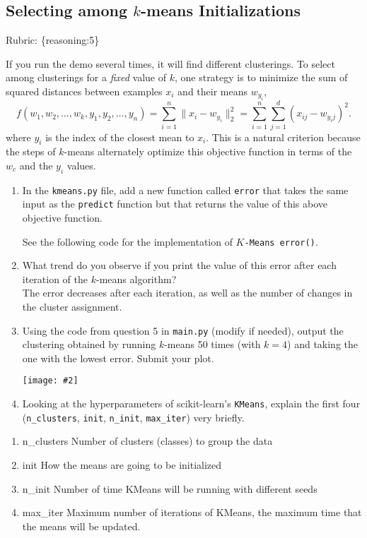 \documentclass{article}
\def\rubric#1{\gre{Rubric: \{#1\}}}{}
\def\blu#1{{\color{blu}#1}}
\def\gre#1{{\color{gre}#1}}
\def\ans#1{{\color{ans}#1}}
\def\norm#1{\|#1\|}
\newcommand{\centerfig}[2]{\begin{center}\texttt{[image: \#2]}\end{center}}
\def\enum#1{\begin{enumerate}#1\end{enumerate}}
\begin{document}
\subsection{Selecting among $k$-means Initializations}
\rubric{reasoning:5}

If you run the demo several times, it will find different clusterings. To select among clusterings for a \emph{fixed} value of $k$, one strategy is to minimize the sum of squared distances between examples $x_i$ and their means $w_{y_i}$,
\[
f(w_1,w_2,\dots,w_k,y_1,y_2,\dots,y_n) = \sum_{i=1}^n \norm{x_i - w_{y_i}}_2^2 = \sum_{i=1}^n \sum_{j=1}^d (x_{ij} - w_{y_ij})^2.
\]
 where $y_i$ is the index of the closest mean to $x_i$. This is a natural criterion because the steps of $k$-means alternately optimize this objective function in terms of the $w_c$ and the $y_i$ values.

 \blu{\enum{
 \item In the \texttt{kmeans.py} file, add a new function called \texttt{error} that takes the same input as the \texttt{predict} function but that returns the value of this above objective function. \\
   \ans{
      See the following code for the implementation of \texttt{$K$-Means error()}.\\
      \begin{center}
         
     \end{center}
   }
 \item What trend do you observe if you print the value of this error after each iteration of the $k$-means algorithm? \\ 
   \ans{
      The error decreases after each iteration, as well as the number of changes in the cluster assignment.
   }
 \item Using the code from question 5 in \texttt{main.py} (modify if needed), output the clustering obtained by running $k$-means 50 times (with $k=4$) and taking the one with the lowest error. Submit your plot. \\
   \ans{
      \centerfig{1}{../figs/q_5_1_kmeans.pdf}
   }
 \item Looking at the hyperparameters of scikit-learn's \texttt{KMeans}, explain the first four (\texttt{n\_clusters}, \texttt{init}, \texttt{n\_init}, \texttt{max\_iter}) very briefly.
 }} 
 \ans{
    \begin{enumerate}
      \item n\_clusters\: Number of clusters (classes) to group the data
      \item init\: How the means are going to be initialized
      \item n\_init\: Number of time KMeans will be running with different seeds
      \item max\_iter\: Maximum number of iterations of KMeans, the maximum time that the means will be updated.
    \end{enumerate}
 }
\end{document}
